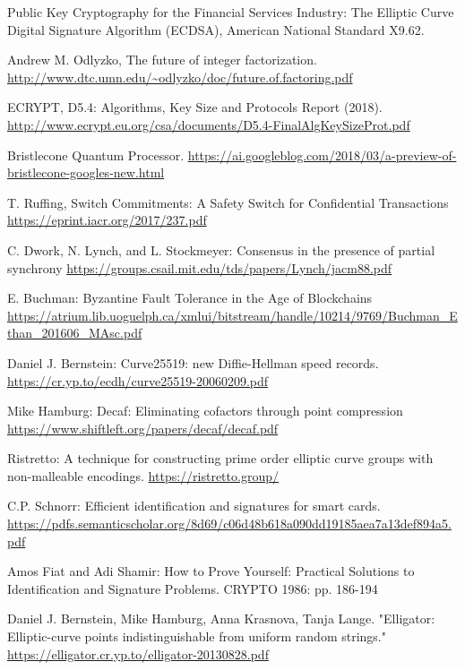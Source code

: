 \documentclass[a4paper,11pt]{article}
\begin{document}
\begin{thebibliography}{999}

	Public Key Cryptography for the Financial Services Industry: The Elliptic Curve Digital Signature Algorithm (ECDSA), American National Standard X9.62.
	
	Andrew M. Odlyzko, The future of integer factorization. \url{http://www.dtc.umn.edu/~odlyzko/doc/future.of.factoring.pdf}

	ECRYPT, D5.4: Algorithms, Key Size and Protocols Report (2018). \url{http://www.ecrypt.eu.org/csa/documents/D5.4-FinalAlgKeySizeProt.pdf}

	Bristlecone Quantum Processor. \url{https://ai.googleblog.com/2018/03/a-preview-of-bristlecone-googles-new.html}
	
	T. Ruffing, Switch Commitments: A Safety Switch for Confidential Transactions \url{https://eprint.iacr.org/2017/237.pdf}
	
	C. Dwork, N. Lynch, and L. Stockmeyer: Consensus in the presence of partial synchrony \url{https://groups.csail.mit.edu/tds/papers/Lynch/jacm88.pdf}
	
	E. Buchman: Byzantine Fault Tolerance in the Age of Blockchains \url{https://atrium.lib.uoguelph.ca/xmlui/bitstream/handle/10214/9769/Buchman_Ethan_201606_MAsc.pdf}
	
	Daniel J. Bernstein: Curve25519: new Diffie-Hellman speed records. \url{https://cr.yp.to/ecdh/curve25519-20060209.pdf}
	
	Mike Hamburg: Decaf: Eliminating cofactors through point compression \url{https://www.shiftleft.org/papers/decaf/decaf.pdf}
	
	Ristretto: A technique for constructing prime order elliptic curve groups with non-malleable encodings. \url{https://ristretto.group/}

	C.P. Schnorr: Efficient identification and signatures for smart cards. \url{https://pdfs.semanticscholar.org/8d69/c06d48b618a090dd19185aea7a13def894a5.pdf}

	Amos Fiat and Adi Shamir: How to Prove Yourself: Practical Solutions to Identification and Signature Problems. CRYPTO 1986: pp. 186-194

	Daniel J. Bernstein, Mike Hamburg, Anna Krasnova, Tanja Lange. "Elligator: Elliptic-curve points indistinguishable from uniform random strings." \url{https://elligator.cr.yp.to/elligator-20130828.pdf}
	

\end{thebibliography}
\end{document}
